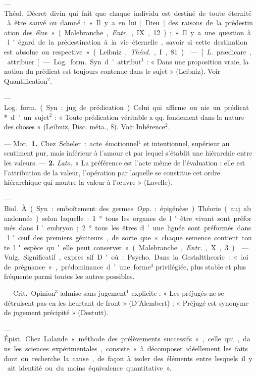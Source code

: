 \begin{itemize}[leftmargin=1cm, label=, itemsep=1pt]
 — \si{Théol.} Décret divin
qui fait que chaque individu est
destiné de toute éternité à être
sauvé ou damné : « Il y a en lui
[Dieu] des raisons de la prédestination des élus » (Malebranche, {\it Entr.},
IX, 12) ; « Il y a une question à
l'égard de la prédestination à la vie
éternelle, savoir si cette destination est absolue ou respective »
(Leibniz, {\it Théod.}, I, 81).

 — [{\it L.} prædicare, attribuer]
— \si{Log.} \si{form.} Syn. d'attribut$^1$ :
« Dans une proposition vraie, la
notion du prédicat est toujours contenue dans le sujet » (Leibniz). Voir
Quantification$^2$.

 — \si{Log.} \si{form.}
(Syn. : jug. de prédication). Celui qui
affirme ou nie un prédicat* d’un
sujet$^2$ : « Toute prédication véritable
a qq. fondement dans la nature des
choses » (Leibniz, Disc. méta., 8).
Voir Inhérence$^2$.

 — \si{Mor.} {\bf 1.} Chez Scheler :
acte émotionnel$^1$ et intentionnel,
supérieur au sentiment pur, mais
inférieur à l'amour et par lequel
s'établit une hiérarchie entre les
valeurs. — {\bf 2.} {\it Lato.} « La préférence est
l'acte même de l'évaluation : elle
est l’attribution de la valeur, l’opération par laquelle se constitue cet
ordre hiérarchique qui montre la
valeur à l’œuvre » (Lavelle).

 — \si{Biol.} À. (Syn. : emboîtement des germes. {\it Opp.} : épigénèse). Théorie (auj. abandonnée)
selon laquelle : 1° tous les organes
de l'être vivant sont préformés dans
l'embryon; 2° tous les êtres d’une
lignée sont préformés dans l'œuf des
premiers géniteurs, de sorte que
« chaque semence contient toute
l'espèce qu’elle peut conserver »
(Malebranche, {\it Entr.}, X, 3).

 — \si{Vulg.} Significatif, expres
sif. D'où : \si{Psycho.} Dans la Gestalttheorie :
« loi de prégnance », prédominance d’une forme$^4$ privilégiée,
plus stable et plus fréquente parmi
toutes les autres possibles.

 — \si{Crit.} Opinion$^3$ admise sans
jugement$^1$ explicite : « Les préjugés ne se détruisent pas en les
heurtant de front » (D’Alembert) ;
« Préjugé est synonyme de jugement précipité » (Destutt).

 — \si{Épist.} Chez Lalande
« méthode des prélèvements successifs », celle qui, dans les sciences
expérimentales, consiste « à décomposer idéellement les faits dont on
recherche la cause, de façon à isoler
des éléments entre lesquels il y ait
identité ou du moins équivalence
quantitative ».


\end{itemize}
